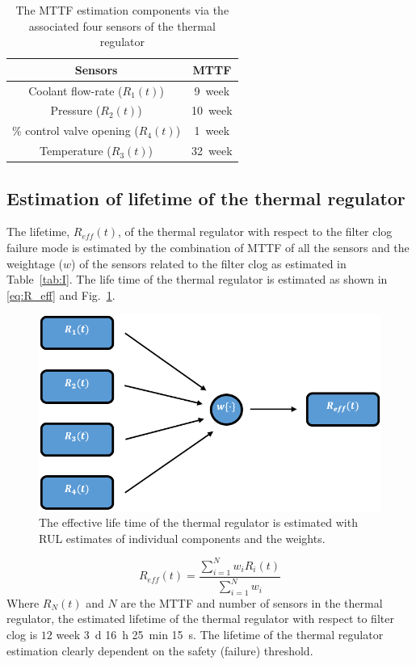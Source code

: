 \documentclass[conference]{IEEEtran}
\begin{document}
\begin{table}[b]
    \caption{The MTTF estimation components via the associated four sensors of the thermal regulator}
    \begin{center}
        \begin{tabular}{|c|c|}
            \hline
            \textbf{Sensors}& \textbf{MTTF} \\
            \hline
            Coolant flow-rate ($R_1(t)$) & \num{9}~week  \\
            \hline
            Pressure ($R_2(t)$) & \num{10}~week \\
            \hline
            \% control valve opening ($R_4(t)$) & \num{1}~week \\
            \hline
            Temperature ($R_3(t)$) & \num{32}~week \\
            \hline
        \end{tabular}
        \label{tab:III}
    \end{center}
\end{table}

\subsection{Estimation of lifetime of the thermal regulator}
\label{subsec:Lifetime}
The lifetime, $R_{eff} (t)$, of the thermal regulator with respect to the filter clog failure mode is estimated by the combination of MTTF of all the sensors and the weightage ($w$) of the sensors related to the filter clog as estimated in Table~\ref{tab:I}. The life time of the thermal regulator is estimated as shown in \eqref{eq:R_eff} and Fig.~\ref{fig:R_eff}.
\begin{figure}[tbp]
\centerline{\includegraphics[width=\linewidth]{R_eff.png}}
\caption{The effective life time of the thermal regulator is estimated with RUL estimates of individual components and the weights.}
\label{fig:R_eff}
\end{figure}
\begin{equation}
    R_{eff}(t) = \frac{\sum\limits_{i=1}^N w_i R_i(t)}{\sum\limits_{i=1}^N w_i}
    \label{eq:R_eff}
\end{equation}
Where $R_N (t)$ and $N$ are the MTTF and number of sensors in the thermal regulator, the estimated lifetime of the thermal regulator with respect to filter clog is $12$ week \SI{3}{\day} \SI{16}{\hour} \SI{25}{\minute} \SI{15}{\second}. The lifetime of the thermal regulator estimation clearly dependent on the safety (failure) threshold.
\end{document}
